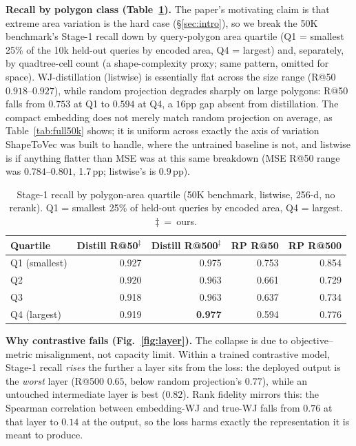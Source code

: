 \documentclass[conference]{IEEEtran}
\begin{document}
\textbf{Recall by polygon class (Table~\ref{tab:bucket}).} The paper's motivating
claim is that extreme area variation is the hard case (\S\ref{sec:intro}), so we
break the 50K benchmark's Stage-1 recall down by query-polygon area quartile (Q1 =
smallest 25\% of the 10k held-out queries by encoded area, Q4 = largest) and,
separately, by quadtree-cell count (a shape-complexity proxy; same pattern, omitted
for space). WJ-distillation (listwise) is essentially flat across the size range
(R@50 $0.918$--$0.927$), while random projection degrades sharply on large
polygons: R@50 falls from $0.753$ at Q1 to $0.594$ at Q4, a $16$pp gap absent from
distillation. The compact embedding does not merely match random projection on
average, as Table~\ref{tab:full50k} shows; it is uniform across exactly the axis of
variation ShapeToVec was built to handle, where the untrained baseline is not, and
listwise is if anything flatter than MSE was at this same breakdown (MSE R@50 range
was $0.784$--$0.801$, 1.7\,pp; listwise's is $0.9$\,pp).

\begin{table}[t]\centering
\caption{Stage-1 recall by polygon-area quartile (50K benchmark, listwise, 256-d,
no rerank). Q1 = smallest 25\% of held-out queries by encoded area, Q4 = largest.
$\ddagger$~=~ours.}
\label{tab:bucket}\setlength{\tabcolsep}{3pt}\footnotesize
\begin{tabular}{@{}lrrrr@{}}
\toprule
Quartile & Distill R@50$^\ddagger$ & Distill R@500$^\ddagger$ & RP R@50 & RP R@500 \\
\midrule
Q1 (smallest) & 0.927 & 0.975 & 0.753 & 0.854 \\
Q2             & 0.920 & 0.963 & 0.661 & 0.729 \\
Q3             & 0.918 & 0.963 & 0.637 & 0.734 \\
Q4 (largest)   & 0.919 & \textbf{0.977} & 0.594 & 0.776 \\
\bottomrule
\end{tabular}
\end{table}

\textbf{Why contrastive fails (Fig.~\ref{fig:layer}).}
The collapse is due to objective--metric misalignment, not capacity limit. Within a
trained contrastive model, Stage-1 recall \emph{rises} the further a layer sits from
the loss: the deployed output is the \emph{worst} layer (R@500 $0.65$, below random
projection's $0.77$), while an untouched intermediate layer is best ($0.82$). Rank
fidelity mirrors this: the Spearman correlation between embedding-WJ and true-WJ
falls from $0.76$ at that layer to $0.14$ at the output, so the loss harms exactly
the representation it is meant to produce.
\end{document}
